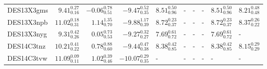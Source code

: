 \documentclass[fleqn,usenatbib,]{mnras}
\begin{document}
\begin{table}
\begin{threeparttable}
\begin{tabular}{lrrrllllll}
DES13X3gms  &   $9.41 _{\scriptscriptstyle 0.16} ^{\scriptscriptstyle 0.27}$ &  $-0.06 _{\scriptscriptstyle 0.51} ^{\scriptscriptstyle 0.78}$ &   $-9.47 _{\scriptscriptstyle 0.35} ^{\scriptscriptstyle 0.52}$ &  $8.51 _{\scriptscriptstyle 0.96} ^{\scriptscriptstyle 0.50}$ &                                                             - &                                                             - &                                                             - &  $8.51 _{\scriptscriptstyle 0.96} ^{\scriptscriptstyle 0.50}$ &  $8.21 _{\scriptscriptstyle 0.48} ^{\scriptscriptstyle 0.48}$ \\
DES13X3npb  &  $11.02 _{\scriptscriptstyle 0.31} ^{\scriptscriptstyle 0.18}$ &   $1.14 _{\scriptscriptstyle 0.70} ^{\scriptscriptstyle 1.35}$ &   $-9.88 _{\scriptscriptstyle 0.39} ^{\scriptscriptstyle 1.17}$ &  $8.72 _{\scriptscriptstyle 0.37} ^{\scriptscriptstyle 0.23}$ &                                                             - &                                                             - &                                                             - &  $8.72 _{\scriptscriptstyle 0.37} ^{\scriptscriptstyle 0.23}$ &  $8.37 _{\scriptscriptstyle 0.22} ^{\scriptscriptstyle 0.26}$ \\
DES13X3nyg  &   $9.31 _{\scriptscriptstyle 0.26} ^{\scriptscriptstyle 0.42}$ &   $0.05 _{\scriptscriptstyle 0.53} ^{\scriptscriptstyle 0.73}$ &   $-9.27 _{\scriptscriptstyle 0.27} ^{\scriptscriptstyle 0.32}$ &  $7.69 _{\scriptscriptstyle 0.72} ^{\scriptscriptstyle 0.61}$ &                                                             - &                                                             - &                                                             - &  $7.69 _{\scriptscriptstyle 0.72} ^{\scriptscriptstyle 0.61}$ &                                                             - \\
DES14C3tnz  &  $10.21 _{\scriptscriptstyle 0.22} ^{\scriptscriptstyle 0.41}$ &   $0.78 _{\scriptscriptstyle 0.60} ^{\scriptscriptstyle 0.88}$ &   $-9.44 _{\scriptscriptstyle 0.38} ^{\scriptscriptstyle 0.47}$ &  $8.38 _{\scriptscriptstyle 0.85} ^{\scriptscriptstyle 0.42}$ &                                                             - &                                                             - &                                                             - &  $8.38 _{\scriptscriptstyle 0.85} ^{\scriptscriptstyle 0.42}$ &  $8.15 _{\scriptscriptstyle 0.29} ^{\scriptscriptstyle 0.29}$ \\
DES14C3tvw  &  $11.09 _{\scriptscriptstyle 0.11} ^{\scriptscriptstyle 0.09}$ &   $1.02 _{\scriptscriptstyle 0.46} ^{\scriptscriptstyle 0.39}$ &  $-10.07 _{\scriptscriptstyle 0.35} ^{\scriptscriptstyle 0.29}$ &                                                             - &                                                             - &                                                             - &                                                             - &                                                             - &                                                             - \\

\end{tabular}
\end{threeparttable}
\end{table}
\end{document}
